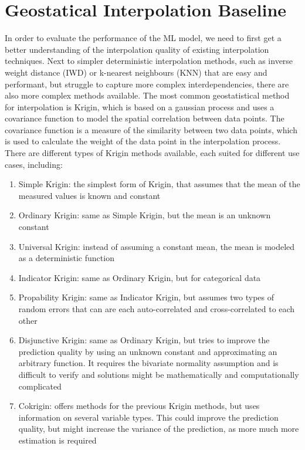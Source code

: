 \section{Geostatical Interpolation Baseline}
In order to evaluate the performance of the ML model, we need to first get a better understanding of the interpolation quality of existing interpolation techniques. Next to simpler deterministic interpolation methods, such as inverse weight distance (IWD) or k-nearest neighbours (KNN) that are easy and performant, but struggle to capture more complex interdependencies, there are also more complex methods available. The most common geostatistical method for interpolation is Krigin, which is based on a gaussian process and uses a covariance function to model the spatial correlation between data points. The covariance function is a measure of the similarity between two data points, which is used to calculate the weight of the data point in the interpolation process. There are different types of Krigin methods available, each suited for different use cases, including:

\begin{enumerate}
    \item Simple Krigin: the simplest form of Krigin, that assumes that the mean of the measured values is known and constant
    \item Ordinary Krigin: same as Simple Krigin, but the mean is an unknown constant
    \item Universal Krigin: instead of assuming a constant mean, the mean is modeled as a deterministic function
    \item Indicator Krigin: same as Ordinary Krigin, but for categorical data
    \item Propability Krigin: same as Indicator Krigin, but assumes two types of random errors that can are each auto-correlated and cross-correlated to each other
    \item Disjunctive Krigin: same as Ordinary Krigin, but tries to improve the prediction quality by using an unknown constant and approximating an arbitrary function. It requires the bivariate normality assumption and is difficult to verify and solutions might be mathematically and computationally complicated
    \item Cokrigin: offers methods for the previous Krigin methods, but uses information on several variable types. This could improve the prediction quality, but might increase the variance of the prediction, as more much more estimation is required
\end{enumerate}

